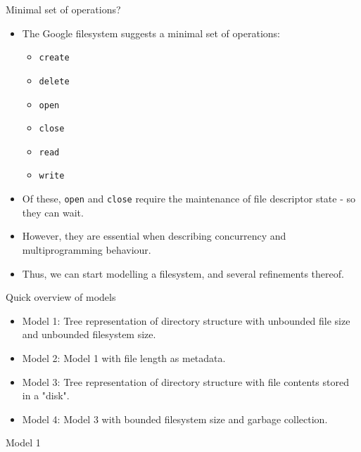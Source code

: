 \documentclass{beamer}
\begin{document}
\begin{frame}{Minimal set of operations?}
  \begin{itemize}
  \item The Google filesystem suggests a minimal set of operations:
    \begin{itemize}
    \item \texttt{create}
    \item \texttt{delete}
    \item \texttt{open}
    \item \texttt{close}
    \item \texttt{read}
    \item \texttt{write}
    \end{itemize}
  \item Of these, \texttt{open} and \texttt{close} require the
    maintenance of file descriptor state - so they can wait.
  \item However, they are essential when describing concurrency and
    multiprogramming behaviour.
  \item Thus, we can start modelling a filesystem, and several
    refinements thereof.
  \end{itemize}
\end{frame}

\begin{frame}{Quick overview of models}
  \begin{itemize}
  \item Model 1: Tree representation of directory structure with unbounded
    file size and unbounded filesystem size.
  \item Model 2: Model 1 with file length as metadata.
  \item Model 3: Tree representation of directory structure with
    file contents stored in a "disk".
  \item Model 4: Model 3 with bounded filesystem size and garbage
    collection.
  \end{itemize}
\end{frame}

\begin{frame}{Model 1}
\end{frame}
\end{document}
